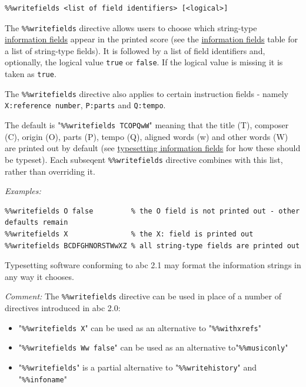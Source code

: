\documentclass[oneside]{book}
\begin{document}
\begin{verbatim}
%%writefields <list of field identifiers> [<logical>]
\end{verbatim}

The \texttt{\%\%writefields} directive allows users to choose which
string-type \protect\hyperlink{information_field_definition}{information
fields} appear in the printed score (see the
\protect\hyperlink{information_fields}{information fields} table for a
list of string-type fields). It is followed by a list of field
identifiers and, optionally, the logical value \texttt{true} or
\texttt{false}. If the logical value is missing it is taken as
\texttt{true}.

The \texttt{\%\%writefields} directive also applies to certain
instruction fields - namely \texttt{X:reference\ number},
\texttt{P:parts} and \texttt{Q:tempo}.

The default is "\texttt{\%\%writefields\ TCOPQwW}" meaning that the
title (T), composer (C), origin (O), parts (P), tempo (Q), aligned words
(w) and other words (W) are printed out by default (see
\protect\hyperlink{typesetting_information_fields}{typesetting
information fields} for how these should be typeset). Each subseqent
\texttt{\%\%writefields} directive combines with this list, rather than
overriding it.

\emph{Examples:}

\begin{verbatim}
%%writefields O false         % the O field is not printed out - other defaults remain
%%writefields X               % the X: field is printed out
%%writefields BCDFGHNORSTWwXZ % all string-type fields are printed out
\end{verbatim}

Typesetting software conforming to abc 2.1 may format the information
strings in any way it chooses.

\emph{Comment:} The \texttt{\%\%writefields} directive can be used in
place of a number of directives introduced in abc 2.0:

\begin{itemize}
\item
  "\texttt{\%\%writefields\ X}" can be used as an alternative to
  "\texttt{\%\%withxrefs}"
\item
  "\texttt{\%\%writefields\ Ww\ false}" can be used as an alternative
  to"\texttt{\%\%musiconly}"
\item
  "\texttt{\%\%writefields}" is a partial alternative to
  "\texttt{\%\%writehistory}" and "\texttt{\%\%infoname}"
\end{itemize}
\end{document}
